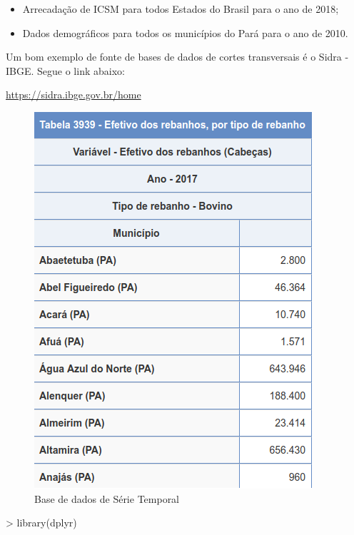 \documentclass[12pt,a4paper,oneside]{erdc}
\begin{document}
\begin{itemize}
\item Arrecadação de ICSM para todos Estados do Brasil para o ano de 2018;
\item Dados demográficos para todos os municípios do Pará para o ano de 2010.
\end{itemize}

Um bom exemplo de fonte de bases de dados de cortes transversais é o Sidra - IBGE. Segue o link abaixo:

\url{https://sidra.ibge.gov.br/home}


\begin{figure}[htpb!]
	\centering
	\includegraphics[width=\linewidth]{../figs/BP_Curso_TecComp_00_2019_f03-03}
	\caption{Base de dados de Série Temporal}
	\label{fig:bpcursoteccomp002019f03-03}
\end{figure}


\begin{Schunk}
\begin{Sinput}
>  library(dplyr)
\end{Sinput}
\end{Schunk}
\end{document}
